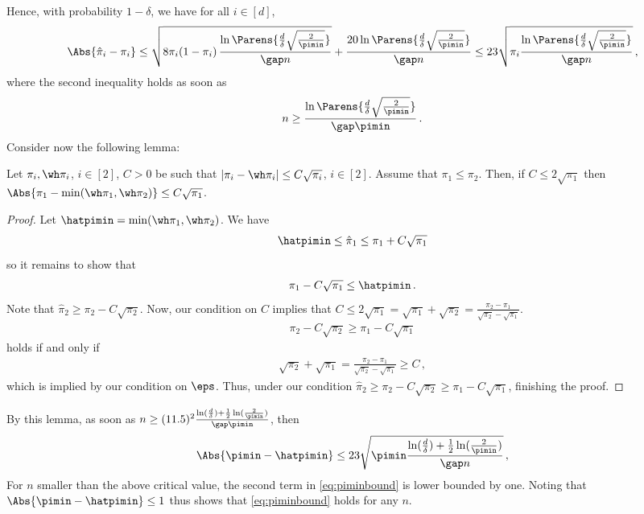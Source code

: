Hence, with probability $1-\delta$, we have for all $i\in [d]$,
\begin{align}
\label{eq:singletonboundsimple}
\Abs{\hat{\pi}_i-\pi_i}
\le
\sqrt{ 8 \pi_i(1-\pi_i) 
\,\frac{
\ln\Parens{\frac{d}\delta\sqrt{\frac{2}{\pimin}}}
  }{\gap n}}
+
\frac{20
  \ln\Parens{\frac{d}\delta\sqrt{\frac{2}{\pimin}}}
}{\gap n}
\le
23 \sqrt{  \pi_i 
	\frac{\ln\Parens{\frac{d}\delta\sqrt{\frac{2}{\pimin}}}
           }{\gap n}
       }\,,
\end{align}
where the second inequality holds as soon as 
\[
n \ge
	\frac{\ln\Parens{\frac{d}\delta\sqrt{\frac{2}{\pimin}}}
           }{\gap \pimin}\,.
\]
Consider now the following lemma:
\begin{lemma}
Let  $\pi_i,\wh\pi_i$, $i\in [2]$, $C>0$ be
such that $|\pi_i - \wh\pi_i| \le C \sqrt{\pi_i}$, $i\in [2]$.
Assume that $\pi_1\le \pi_2$.
Then, if $C\le 2\sqrt{\pi_1}$ then $\Abs{\pi_1 - \min(\wh\pi_1,\wh\pi_2) } \le C \sqrt{\pi_1}$.
\end{lemma}
\begin{proof}
Let $\hatpimin = \min(\wh\pi_1,\wh\pi_2)$.
We have
\begin{align*}
\hatpimin \le \hat{\pi}_1 \le  \pi_1 + C \sqrt{\pi_1}
\end{align*}
so it remains to show that
\begin{align*}
\pi_1 - C \sqrt{\pi_1} \le \hatpimin\,.
\end{align*}
Note that $\hat\pi_2 \ge \pi_2- C \sqrt{\pi_2 } $. Now,
our condition on $C$ implies that $C \le 2 \sqrt{\pi_1} = \sqrt{\pi_1}+\sqrt{\pi_2} = \frac{\pi_2 - \pi_1}{\sqrt{\pi_2}-\sqrt{\pi_1}}$. 
\begin{align*}
\pi_2 - C \sqrt{\pi_2  } \ge \pi_1 - C \sqrt{\pi_1 }
\end{align*}
holds if and only if
\begin{align*}
\sqrt{\pi_2} + \sqrt{\pi_1} = \frac{\pi_2 - \pi_1}{\sqrt{\pi_2} -\sqrt{\pi_1}} \ge C \,,
\end{align*}
which is implied by our condition on $\eps$. Thus, under our condition $\hat\pi_2 \ge \pi_2 - C  \sqrt{\pi_2 } \ge \pi_1 - C \sqrt{\pi_1}$, finishing the proof.
\end{proof}
By this lemma, as soon as $n\ge (11.5)^2 \frac{\ln( \frac{d}{\delta} )+\frac12\ln(\frac2\pimin) }{ \gap\pimin}$,
then
\[
\Abs{\pimin - \hatpimin} \le 23 \sqrt{ \pimin \frac{\ln( \frac{d}{\delta} )+\frac12\ln(\frac2\pimin) }{ \gap n} }\,,
\]
For $n$ smaller than the above critical value, the second term in \eqref{eq:piminbound} is lower bounded by one.
Noting that $\Abs{\pimin-\hatpimin}\le 1$ thus shows that \eqref{eq:piminbound} holds for any $n$.


